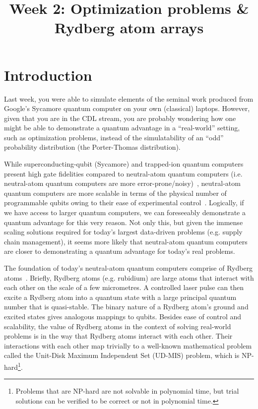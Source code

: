 \documentclass[12pt]{article}
\title{Week 2: Optimization problems \& Rydberg atom arrays}
\author{}
\date{}
\begin{document}
\maketitle

\thispagestyle{empty}

\section*{Introduction}

Last week, you were able to simulate elements of the seminal work produced from Google's Sycamore quantum computer on your own (classical) laptops.
However, given that you are in the CDL stream, you are probably wondering how one might be able to demonstrate a quantum advantage in a ``real-world'' setting, such as optimization problems, instead of the simulatability of an ``odd'' probability distribution (the Porter-Thomas distribution).

While superconducting-qubit (Sycamore) and trapped-ion quantum computers present high gate fidelities compared to neutral-atom quantum computers (i.e. neutral-atom quantum computers are more error-prone/noisy)~\cite{serret_solving_2020}, neutral-atom quantum computers are more scalable in terms of the physical number of programmable qubits owing to their ease of experimental control~\cite{bernien_probing_2017,ebadi_quantum_2020,henriet_quantum_2020,Browaeys2020}.
Logically, if we have access to larger quantum computers, we can foreseeably demonstrate a quantum advantage for this very reason.
Not only this, but given the immense scaling solutions required for today's largest data-driven problems (e.g. supply chain management), it seems more likely that neutral-atom quantum computers are closer to demonstrating a quantum advantage for today's real problems.

The foundation of today's neutral-atom quantum computers comprise of Rydberg atoms~\cite{Browaeys2020}.
Briefly, Rydberg atoms (e.g. rubidium) are large atoms that interact with each other on the scale of a few micrometres.
A controlled laser pulse can then excite a Rydberg atom into a quantum state with a large principal quantum number that is quasi-stable.
The binary nature of a Rydberg atom's ground and excited states gives analogous mappings to qubits.
Besides ease of control and scalability, the value of Rydberg atoms in the context of solving real-world problems is in the way that Rydberg atoms interact with each other. 
Their interactions with each other map trivially to a well-known mathematical problem called the Unit-Disk Maximum Independent Set (UD-MIS) problem, which is NP-hard\footnote{Problems that are NP-hard are not solvable in polynomial time, but trial solutions can be verified to be correct or not in polynomial time.}.
\end{document}
